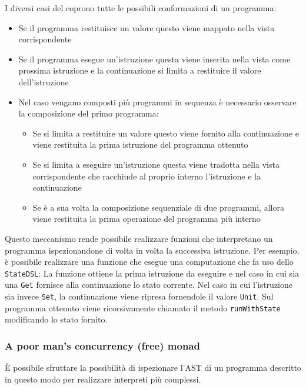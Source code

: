 I diversi casi del  coprono tutte le possibili conformazioni di un programma:
\begin{itemize}
  \item Se il programma restituisce un valore questo viene mappato nella vista corrispondente
  \item Se il programma esegue un'istruzione questa viene inserita nella vista come prossima istruzione e la continuazione si limita a restituire il valore dell'istruzione
  \item Nel caso vengano composti più programmi in sequenza è necessario osservare la composizione del primo programma:
        \begin{itemize}
          \item Se si limita a restituire un valore questo viene fornito alla continuazione e viene restituita la prima istruzione del programma ottenuto
          \item Se si limita a eseguire un'istruzione questa viene tradotta nella vista corrispondente che racchiude al proprio interno l'istruzione e la continuazione
          \item Se è a sua volta la composizione sequenziale di due programmi, allora viene restituita la prima operazione del programma più interno
        \end{itemize}
\end{itemize}

Questo meccanismo rende possibile realizzare funzioni che interpretano un programma ispezionandone di volta in volta la successiva istruzione. Per esempio, è possibile realizzare una funzione che esegue una computazione che fa uso dello \lstinline{StateDSL}:
La funzione ottiene la prima istruzione da eseguire e nel caso in cui sia una \lstinline{Get} fornisce alla continuazione lo stato corrente. Nel caso in cui l'istruzione sia invece \lstinline{Set}, la continuazione viene ripresa fornendole il valore \lstinline{Unit}. Sul programma ottenuto viene ricorsivamente chiamato il metodo \lstinline{runWithState} modificando lo stato fornito.

\subsubsection{A poor man’s concurrency (free) monad}
\label{sec:poor-man}
È possibile sfruttare la possibilità di ispezionare l'AST di un programma descritto in questo modo per realizzare interpreti più complessi.

